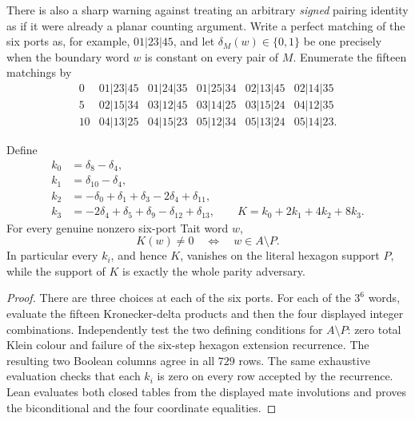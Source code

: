 There is also a sharp warning against treating an arbitrary \emph{signed}
pairing identity as if it were already a planar counting argument.  Write a
perfect matching of the six ports as, for example, \(01|23|45\), and let
\(\delta_M(w)\in\{0,1\}\) be one precisely when the boundary word \(w\) is
constant on every pair of \(M\).  Enumerate the fifteen matchings by
\[
\begin{array}{c|ccccc}
0&01|23|45&01|24|35&01|25|34&02|13|45&02|14|35\\
5&02|15|34&03|12|45&03|14|25&03|15|24&04|12|35\\
10&04|13|25&04|15|23&05|12|34&05|13|24&05|14|23.
\end{array}
\]

\begin{proposition}
\label{prop:hexagon-signed-pairing-adversary}
Define
\[
\begin{aligned}
 k_0&=\delta_8-\delta_4,\\
 k_1&=\delta_{10}-\delta_4,\\
 k_2&=-\delta_0+\delta_1+\delta_3-2\delta_4+\delta_{11},\\
 k_3&=-2\delta_4+\delta_5+\delta_9-\delta_{12}+\delta_{13},
 \qquad K=k_0+2k_1+4k_2+8k_3.
\end{aligned}
\]
For every genuine nonzero six-port Tait word \(w\),
\[
                    K(w)\ne0\quad\Longleftrightarrow\quad w\in A\setminus P.
\]
In particular every \(k_i\), and hence \(K\), vanishes on the literal
hexagon support \(P\), while the support of \(K\) is exactly the whole
parity adversary.
\end{proposition}

\begin{proof}
There are three choices at each of the six ports.  For each of the \(3^6\)
words, evaluate the fifteen Kronecker-delta products and then the four
displayed integer combinations.  Independently test the two defining
conditions for \(A\setminus P\): zero total Klein colour and failure of the
six-step hexagon extension recurrence.  The resulting two Boolean columns
agree in all \(729\) rows.  The same exhaustive evaluation checks that each
\(k_i\) is zero on every row accepted by the recurrence.  Lean evaluates
both closed tables from the displayed mate involutions and proves the
biconditional and the four coordinate equalities.
\end{proof}

